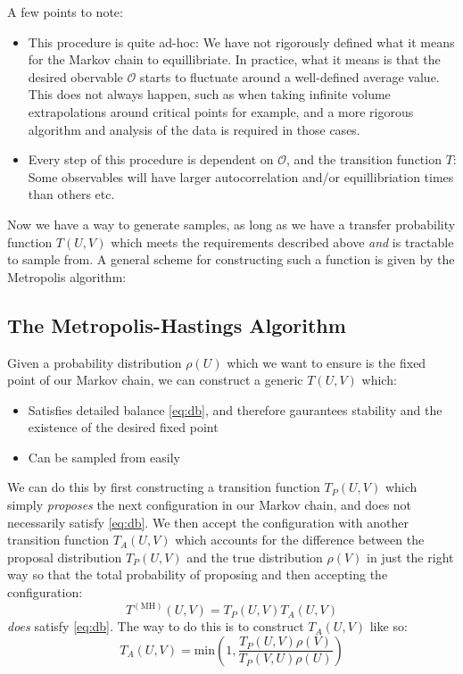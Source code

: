 \documentclass[11pt]{article}
\begin{document}
A few points to note:

\begin{itemize}
\item This procedure is quite ad-hoc: We have not rigorously defined what it means for the Markov chain to equillibriate. In practice, what it means is that the desired obervable $\mathcal O$ starts to fluctuate around a well-defined average value. This does not always happen, such as when taking infinite volume extrapolations around critical points for example, and a more rigorous algorithm and analysis of the data is required in those cases. 
\item Every step of this procedure is dependent on $\mathcal O$, and the transition function $T$: Some observables will have larger autocorrelation and/or equillibriation times than others etc. 
\end{itemize}

Now we have a way to generate samples, as long as we have a transfer probability function $T(U,V)$ which meets the requirements described above \textit{and} is tractable to sample from. A general scheme for constructing such a function is given by the Metropolis algorithm:
 
\subsection{The Metropolis-Hastings Algorithm}

Given a probability distribution $\rho (U)$ which we want to ensure is the fixed point of our Markov chain, we can construct a generic $T(U,V)$ which:

\begin{itemize}
\item Satisfies detailed balance \eqref{eq:db}, and therefore gaurantees stability and the existence of the desired fixed point
\item Can be sampled from easily
\end{itemize}

We can do this by first constructing a transition function $T_P(U,V)$ which simply \textit{proposes} the next configuration in our Markov chain, and does not necessarily satisfy \eqref{eq:db}. We then accept the configuration with another transition function $T_A(U,V)$ which accounts for the difference between the proposal distribution $T_P(U,V)$ and the true distribution $\rho(V)$ in just the right way so that the total probability of proposing and then accepting the configuration:
\begin{equation}\label{eq:metropolis_hastings_full}T^{(\mathrm{MH})}(U,V)=T_P(U,V)T_A(U,V)\end{equation}
\textit{does} satisfy \eqref{eq:db}.
The way to do this is to construct $T_A(U,V)$ like so:
\begin{equation}\label{eq:metropolis_hastings_acceptance}T_A(U,V)=\mathrm{min}\left(1,\frac{T_P(U,V)\rho(V)}{T_P(V,U)\rho(U)}\right)\end{equation}
\end{document}
